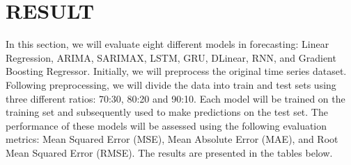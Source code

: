 \documentclass{ieeeojies}
\begin{document}
\section{RESULT}
In this section, we will evaluate eight different models in forecasting: Linear Regression, ARIMA, SARIMAX, LSTM, GRU, DLinear, RNN, and Gradient Boosting Regressor. Initially, we will preprocess the original time series dataset. Following preprocessing, we will divide the data into train and test sets using three different ratios: 70:30, 80:20 and 90:10. Each model will be trained on the training set and subsequently used to make predictions on the test set. The performance of these models will be assessed using the following evaluation metrics: Mean Squared Error (MSE), Mean Absolute Error (MAE), and Root Mean Squared Error (RMSE). The results are presented in the tables below.
\end{document}
